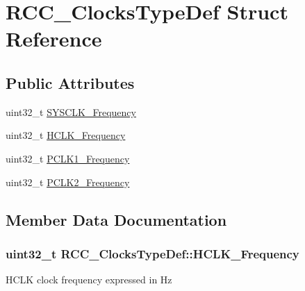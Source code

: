 \hypertarget{struct_r_c_c___clocks_type_def}{}\section{R\+C\+C\+\_\+\+Clocks\+Type\+Def Struct Reference}
\label{struct_r_c_c___clocks_type_def}
\subsection*{Public Attributes}
\begin{DoxyCompactItemize}
\item 
uint32\+\_\+t \hyperlink{struct_r_c_c___clocks_type_def_a2ba325067f3d464ad7955358932563d8}{S\+Y\+S\+C\+L\+K\+\_\+\+Frequency}
\item 
uint32\+\_\+t \hyperlink{struct_r_c_c___clocks_type_def_a41b9859d33954117daf7fab42f804b92}{H\+C\+L\+K\+\_\+\+Frequency}
\item 
uint32\+\_\+t \hyperlink{struct_r_c_c___clocks_type_def_add4cfc63c35178d187107edc764e0b8f}{P\+C\+L\+K1\+\_\+\+Frequency}
\item 
uint32\+\_\+t \hyperlink{struct_r_c_c___clocks_type_def_ad854f0b70a6c4cf6de6dbbdcbc99b856}{P\+C\+L\+K2\+\_\+\+Frequency}
\end{DoxyCompactItemize}


\subsection{Member Data Documentation}
\subsubsection[{\texorpdfstring{H\+C\+L\+K\+\_\+\+Frequency}{HCLK_Frequency}}]{\setlength{\rightskip}{0pt plus 5cm}uint32\+\_\+t R\+C\+C\+\_\+\+Clocks\+Type\+Def\+::\+H\+C\+L\+K\+\_\+\+Frequency}\hypertarget{struct_r_c_c___clocks_type_def_a41b9859d33954117daf7fab42f804b92}{}\label{struct_r_c_c___clocks_type_def_a41b9859d33954117daf7fab42f804b92}
H\+C\+LK clock frequency expressed in Hz 
